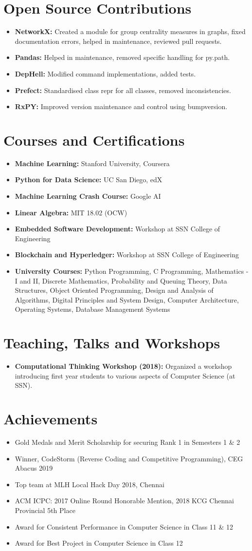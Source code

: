 \documentclass[letterpaper,11pt]{article}
\newcommand{\resumeItem}[2]{
\item\small{
\textbf{#1}{ #2 \vspace{-2pt}}
}
}
\newcommand{\resumeSubHeadingListStart}{\begin{itemize}[leftmargin=*]}
\newcommand{\resumeSubHeadingListEnd}{\end{itemize}}
\begin{document}
\section{Open Source Contributions}
\resumeSubHeadingListStart
\resumeItem{NetworkX:}{Created a module for group centrality measures in graphs, fixed documentation errors, helped in maintenance, reviewed pull requests.}
\resumeItem{Pandas:}{Helped in maintenance, removed specific handling for py.path.}
\resumeItem{DepHell:}{Modified command implementations, added tests.}
\resumeItem{Prefect:}{Standardised class repr for all classes, removed inconsistencies.}
\resumeItem{RxPY:}{Improved version maintenance and control using bumpversion.}
\resumeSubHeadingListEnd

\section{Courses and Certifications}
\resumeSubHeadingListStart
\resumeItem{Machine Learning:}{Stanford University, Coursera}
\resumeItem{Python for Data Science:}{UC San Diego, edX}
\resumeItem{Machine Learning Crash Course:}{Google AI}
\resumeItem{Linear Algebra:}{MIT 18.02 (OCW)}
\resumeItem{Embedded Software Development:}{Workshop at SSN College of Engineering}
\resumeItem{Blockchain and Hyperledger:}{Workshop at SSN College of Engineering}
\resumeItem{University Courses:}{Python Programming, C Programming, Mathematics - I and II, Discrete Mathematics, Probability and Queuing Theory, Data Structures, Object Oriented Programming, Design and Analysis of Algorithms, Digital Principles and System Design, Computer Architecture, Operating Systems, Database Management Systems}
\resumeSubHeadingListEnd

\section{Teaching, Talks and Workshops}
\resumeSubHeadingListStart
\resumeItem{Computational Thinking Workshop (2018):}{Organized a workshop introducing first year students to various aspects of Computer Science (at SSN).}
\resumeSubHeadingListEnd

\section{Achievements}
\resumeSubHeadingListStart
\resumeItem{}{Gold Medals and Merit Scholarship for securing Rank 1 in Semesters 1 \& 2}
\resumeItem{}{Winner, CodeStorm (Reverse Coding and Competitive Programming), CEG Abacus 2019}
\resumeItem{}{Top team at MLH Local Hack Day 2018, Chennai}
\resumeItem{}{ACM ICPC: 2017 Online Round Honorable Mention, 2018 KCG Chennai Provincial 5th Place}
\resumeItem{}{Award for Consistent Performance in Computer Science in Class 11 \& 12}
\resumeItem{}{Award for Best Project in Computer Science in Class 12}
\resumeSubHeadingListEnd
\end{document}
